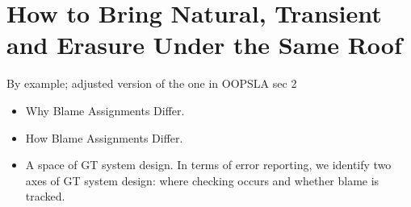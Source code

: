 \section{How to Bring Natural, Transient and Erasure Under the Same Roof} \label{sec:landscape}


   By example; adjusted version of the one in OOPSLA sec 2

  \begin{itemize}

  \item Why Blame Assignments Differ.

  \item How Blame Assignments Differ.

  \item A space of GT system design. In terms of error reporting, we identify two axes of GT system
        design: where checking occurs and whether blame is tracked.
    

  \end{itemize}



